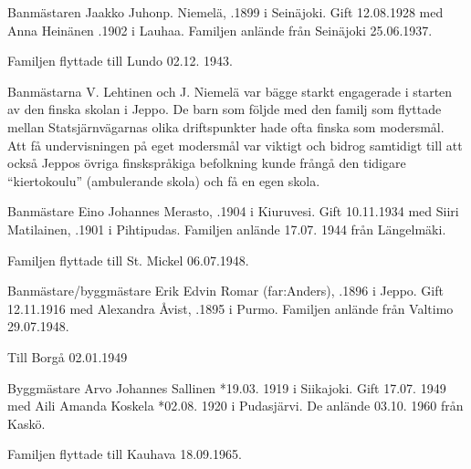 Banmästaren Jaakko Juhonp. Niemelä, .1899 i Seinäjoki. Gift 12.08.1928 med Anna Heinänen .1902 i Lauhaa. Familjen anlände från Seinäjoki 25.06.1937.
\begin{jhchildren}
  \item {}
  \item {}
\end{jhchildren}
Familjen flyttade till  Lundo 02.12. 1943.


Banmästarna V. Lehtinen och J. Niemelä var bägge starkt engagerade i starten av den finska skolan i Jeppo. De barn som följde med den familj som flyttade mellan Statsjärnvägarnas olika driftspunkter hade ofta finska som modersmål. Att få undervisningen på eget modersmål var viktigt och bidrog samtidigt till att också Jeppos övriga finskspråkiga befolkning kunde frångå den tidigare ``kiertokoulu'' (ambulerande skola) och få en egen skola.


Banmästare Eino Johannes Merasto, .1904 i Kiuruvesi. Gift 10.11.1934 med Siiri Matilainen, .1901 i Pihtipudas. Familjen anlände 17.07. 1944 från Längelmäki.
\begin{jhchildren}
  \item {}
  \item {}
  \item {}
\end{jhchildren}
Familjen flyttade till St. Mickel 06.07.1948.


Banmästare/byggmästare Erik Edvin Romar (far:Anders), .1896 i Jeppo. Gift 12.11.1916 med Alexandra Åvist, .1895 i Purmo. Familjen anlände från Valtimo 29.07.1948.
\begin{jhchildren}
  \item {}
  \item {} Till Borgå 02.01.1949
  \item {}
\end{jhchildren}


Byggmästare Arvo Johannes Sallinen *19.03. 1919 i Siikajoki. Gift 17.07.
1949 med Aili Amanda Koskela *02.08. 1920 i Pudasjärvi. De anlände 03.10. 1960 från Kaskö.
\begin{jhchildren}
  \item {}
  \item {}
  \item {}
  \item {}
\end{jhchildren}
Familjen flyttade till Kauhava 18.09.1965.


